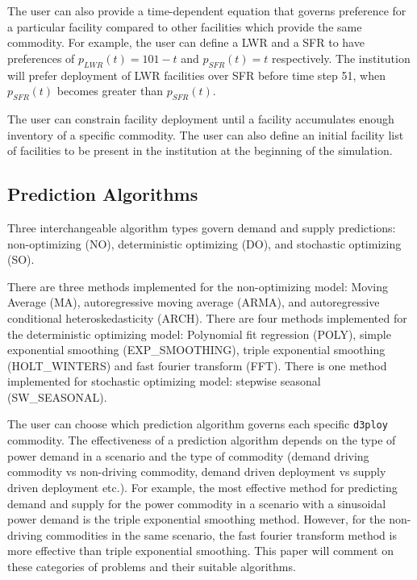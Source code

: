 \documentclass[11pt]{article}
\newcommand{\deploy}{\texttt{d3ploy}\xspace}%
\begin{document}
The user can also provide a time-dependent equation that governs
preference for a particular facility compared to other facilities which 
provide the same commodity. 
For example, the user can define a \gls{LWR} and a \gls{SFR} to have
preferences of $p_{LWR}(t) = 101 - t$ and $p_{SFR}(t) = t$ respectively. 
The institution will prefer deployment of \gls{LWR} facilities over 
\gls{SFR} before time step 51, when $p_{SFR}(t)$ becomes greater than 
$p_{SFR}(t)$. 

The user can constrain facility deployment 
until a facility accumulates enough inventory of a specific commodity.  
The user can also define an initial facility list of facilities to be 
present in the institution at the beginning of the simulation. 

\subsection{\textbf{Prediction Algorithms}}
Three interchangeable algorithm types govern demand and supply 
predictions: non-optimizing (NO), deterministic optimizing (DO), and stochastic
optimizing (SO). 

There are three methods implemented for the non-optimizing model: 
Moving Average (MA), autoregressive moving average (ARMA), and autoregressive 
conditional heteroskedasticity (ARCH).
There are four methods implemented for the deterministic optimizing model: 
Polynomial fit regression (POLY), simple exponential smoothing (EXP\_SMOOTHING),
triple exponential smoothing (HOLT\_WINTERS) and fast fourier 
transform (FFT). 
There is one method implemented for stochastic optimizing model: 
stepwise seasonal (SW\_SEASONAL).  

The user can choose which prediction algorithm governs each specific 
\deploy commodity. 
The effectiveness of a prediction algorithm depends on the type 
of power demand in a scenario and the type of commodity (demand 
driving commodity vs non-driving commodity, demand driven 
deployment vs supply driven deployment etc.). 
For example, the most effective method
for predicting demand and supply for the power commodity in a scenario  
with a sinusoidal power demand is the triple exponential smoothing method. 
However, for the non-driving commodities in the same 
scenario, the fast fourier transform method is more effective than triple 
exponential smoothing. 
This paper will comment on these categories of problems and their suitable
algorithms. 
\end{document}
